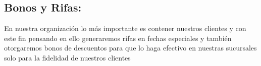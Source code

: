\subsection{Bonos y Rifas:} En nuestra  organizaci\'on lo m\'as importante es contener nuestros clientes y con este fin pensando en ello generaremos rifas en fechas especiales y tambi\'en otorgaremos bonos de descuentos para que lo haga efectivo en nuestras sucursales solo para la fidelidad de nuestros clientes 
%
%
